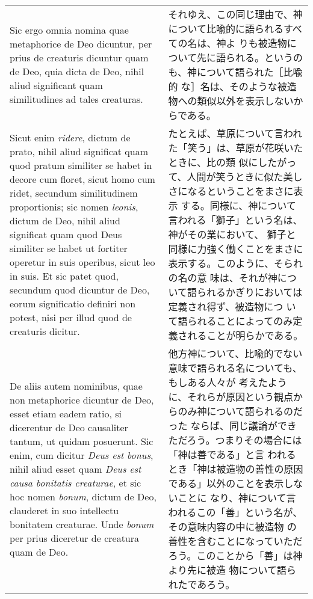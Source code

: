 \documentclass[paper=a4paper,fontsize=10pt,jafontsize=9pt,titlepage]{jlreq}
\begin{document}
\begin{longtable}{p{21em}p{21em}}
\\

Sic ergo omnia nomina quae metaphorice de Deo dicuntur, per prius de
creaturis dicuntur quam de Deo, quia dicta de Deo, nihil aliud
significant quam similitudines ad tales creaturas.

&

それゆえ、この同じ理由で、神について比喩的に語られるすべての名は、神よ
りも被造物について先に語られる。というのも、神について語られた［比喩的
な］名は、そのような被造物への類似以外を表示しないからである。

\\

Sicut enim {\itshape ridere}, dictum de prato, nihil aliud significat
quam quod pratum similiter se habet in decore cum floret, sicut homo
cum ridet, secundum similitudinem proportionis; sic nomen {\itshape
leonis}, dictum de Deo, nihil aliud significat quam quod Deus
similiter se habet ut fortiter operetur in suis operibus, sicut leo in
suis. Et sic patet quod, secundum quod dicuntur de Deo, eorum
significatio definiri non potest, nisi per illud quod de creaturis
dicitur.

&

たとえば、草原について言われた「笑う」は、草原が花咲いたときに、比の類
似にしたがって、人間が笑うときに似た美しさになるということをまさに表示
する。同様に、神について言われる「獅子」という名は、神がその業において、
獅子と同様に力強く働くことをまさに表示する。このように、そられの名の意
味は、それが神について語られるかぎりにおいては定義され得ず、被造物につ
いて語られることによってのみ定義されることが明らかである。

\\

De aliis autem nominibus, quae non metaphorice dicuntur de Deo, esset
etiam eadem ratio, si dicerentur de Deo causaliter tantum, ut quidam
posuerunt. Sic enim, cum dicitur {\itshape Deus est bonus}, nihil
aliud esset quam {\itshape Deus est causa bonitatis creaturae}, et sic
hoc nomen {\itshape bonum}, dictum de Deo, clauderet in suo intellectu
bonitatem creaturae. Unde {\itshape bonum} per prius diceretur de
creatura quam de Deo.

&

他方神について、比喩的でない意味で語られる名についても、もしある人々が
考えたように、それらが原因という観点からのみ神について語られるのだった
ならば、同じ議論ができただろう。つまりその場合には「神は善である」と言
われるとき「神は被造物の善性の原因である」以外のことを表示しないことに
なり、神について言われるこの「善」という名が、その意味内容の中に被造物
の善性を含むことになっていただろう。このことから「善」は神より先に被造
物について語られたであろう。


\end{longtable}
\end{document}
